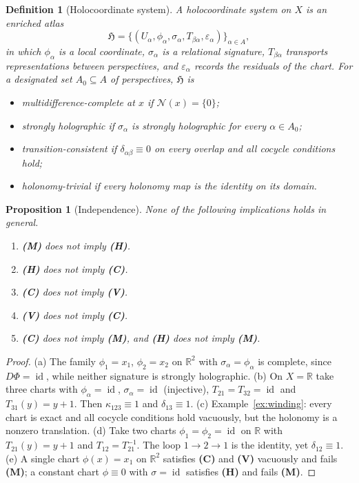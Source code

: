 \documentclass[11pt]{article}
\newtheorem{definition}{Definition}
\newtheorem{proposition}{Proposition}
\theoremstyle{remark}
\newcommand{\R}{\mathbb{R}}
\newcommand{\N}{\mathcal{N}}
\newcommand{\id}{\operatorname{id}}
\begin{document}
\begin{definition}[Holocoordinate system]\label{def:holo}
A \emph{holocoordinate system} on $X$ is an enriched atlas
\[
\mathfrak H=\bigl\{(U_\alpha,\phi_\alpha,\sigma_\alpha,T_{\beta\alpha},\varepsilon_\alpha)\bigr\}_{\alpha\in A},
\]
in which $\phi_\alpha$ is a local coordinate, $\sigma_\alpha$ is a relational signature, $T_{\beta\alpha}$ transports representations between perspectives, and $\varepsilon_\alpha$ records the residuals of the chart. For a designated set $A_0\subseteq A$ of perspectives, $\mathfrak H$ is
\begin{itemize}[nosep]
\item[\textbf{(M)}] \emph{multidifference-complete at $x$} if $\N(x)=\{0\}$;
\item[\textbf{(H)}] \emph{strongly holographic} if $\sigma_\alpha$ is strongly holographic for every $\alpha\in A_0$;
\item[\textbf{(C)}] \emph{transition-consistent} if $\delta_{\alpha\beta}\equiv0$ on every overlap and all cocycle conditions hold;
\item[\textbf{(V)}] \emph{holonomy-trivial} if every holonomy map is the identity on its domain.
\end{itemize}
\end{definition}

\begin{proposition}[Independence]\label{prop:indep}
None of the following implications holds in general.
\begin{enumerate}[label=(\alph*),nosep]
\item \textbf{(M)} does not imply \textbf{(H)}.
\item \textbf{(H)} does not imply \textbf{(C)}.
\item \textbf{(C)} does not imply \textbf{(V)}.
\item \textbf{(V)} does not imply \textbf{(C)}.
\item \textbf{(C)} does not imply \textbf{(M)}, and \textbf{(H)} does not imply \textbf{(M)}.
\end{enumerate}
\end{proposition}

\begin{proof}
(a) The family $\phi_1=x_1$, $\phi_2=x_2$ on $\R^2$ with $\sigma_\alpha=\phi_\alpha$ is complete, since $D\Phi=\id$, while neither signature is strongly holographic. (b) On $X=\R$ take three charts with $\phi_\alpha=\id$, $\sigma_\alpha=\id$ (injective), $T_{21}=T_{32}=\id$ and $T_{31}(y)=y+1$. Then $\kappa_{123}\equiv1$ and $\delta_{13}\equiv1$. (c) Example~\ref{ex:winding}: every chart is exact and all cocycle conditions hold vacuously, but the holonomy is a nonzero translation. (d) Take two charts $\phi_1=\phi_2=\id$ on $\R$ with $T_{21}(y)=y+1$ and $T_{12}=T_{21}^{-1}$. The loop $1\to2\to1$ is the identity, yet $\delta_{12}\equiv1$. (e) A single chart $\phi(x)=x_1$ on $\R^2$ satisfies \textbf{(C)} and \textbf{(V)} vacuously and fails \textbf{(M)}; a constant chart $\phi\equiv0$ with $\sigma=\id$ satisfies \textbf{(H)} and fails \textbf{(M)}.
\end{proof}
\end{document}
